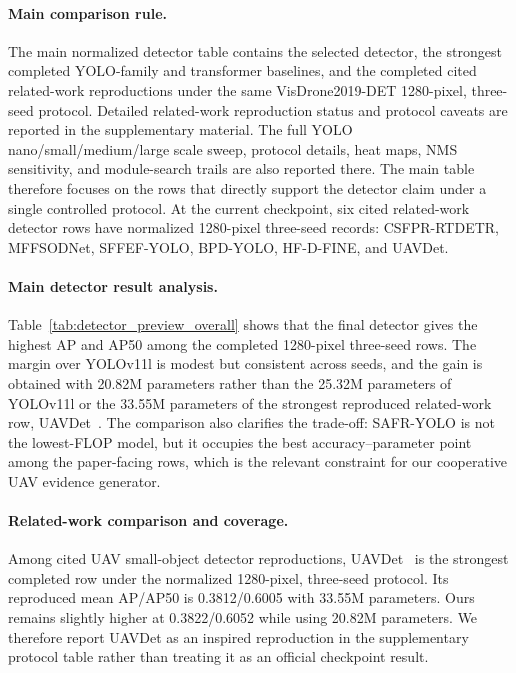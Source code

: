 \paragraph{Main comparison rule.}
The main normalized detector table contains the selected detector, the strongest
completed YOLO-family and transformer baselines, and the completed cited
related-work reproductions under the same VisDrone2019-DET 1280-pixel,
three-seed protocol. Detailed related-work reproduction status and protocol
caveats are reported in the supplementary material. The full YOLO
nano/small/medium/large scale sweep, protocol details, heat maps, NMS
sensitivity, and module-search trails are also reported there. The main table
therefore focuses on the rows that directly support the detector claim under a
single controlled protocol.
At the current checkpoint, six cited related-work detector rows have normalized
1280-pixel three-seed records: CSFPR-RTDETR, MFFSODNet, SFFEF-YOLO, BPD-YOLO,
HF-D-FINE, and UAVDet.



\paragraph{Main detector result analysis.}
Table~\ref{tab:detector_preview_overall} shows that the final detector gives
the highest AP and AP50 among the completed 1280-pixel three-seed rows. The
margin over YOLOv11l is modest but consistent across seeds, and the gain is
obtained with 20.82M parameters rather than the 25.32M parameters of YOLOv11l
or the 33.55M parameters of the strongest reproduced related-work row,
UAVDet~\cite{yang2026uavdet}. The comparison also clarifies the trade-off:
SAFR-YOLO is not the lowest-FLOP model, but it occupies the best
accuracy--parameter point among the paper-facing rows, which is the relevant
constraint for our cooperative UAV evidence generator.

\paragraph{Related-work comparison and coverage.}
Among cited UAV small-object detector reproductions, UAVDet~\cite{yang2026uavdet} is the
strongest completed row under the normalized 1280-pixel, three-seed protocol.
Its reproduced mean AP/AP50 is 0.3812/0.6005 with 33.55M parameters. Ours
remains slightly higher at 0.3822/0.6052 while using 20.82M parameters. We
therefore report UAVDet as an inspired reproduction in the supplementary
protocol table rather than treating it as an official checkpoint result.

